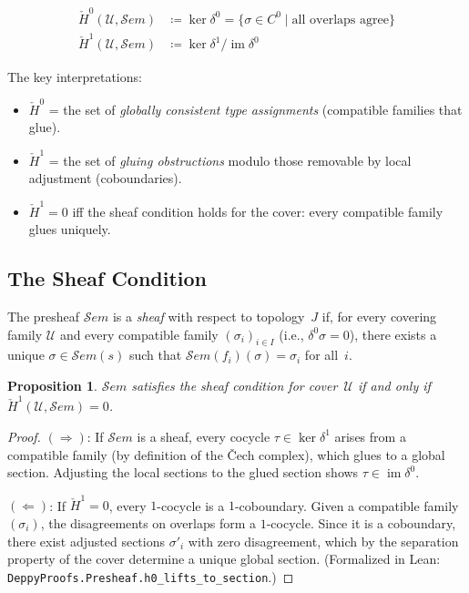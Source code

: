 \documentclass[acmsmall,screen]{acmart}
\newtheorem{proposition}{Proposition}
\theoremstyle{remark}
\newcommand{\Sem}{\mathcal{S}\mathit{em}}
\newcommand{\Hc}[1]{\check{H}^{#1}}
\newcommand{\im}{\operatorname{im}}
\newcommand{\defeq}{\coloneqq}
\begin{document}
\begin{definition}\label{def:cech-groups}
\begin{align*}
  \Hc{0}(\mathcal{U}, \Sem) &\defeq \ker \delta^0
    = \{ \sigma \in C^0 \mid \text{all overlaps agree} \} \\
  \Hc{1}(\mathcal{U}, \Sem) &\defeq \ker \delta^1 / \im \delta^0
\end{align*}
\end{definition}

The key interpretations:
\begin{itemize}[nosep]
  \item $\Hc{0}$ = the set of \emph{globally consistent type
    assignments} (compatible families that glue).
  \item $\Hc{1}$ = the set of \emph{gluing obstructions} modulo
    those removable by local adjustment (coboundaries).
  \item $\Hc{1} = 0$ iff the sheaf condition holds for the cover:
    every compatible family glues uniquely.
\end{itemize}

\subsection{The Sheaf Condition}\label{sec:sheaf-condition}

\begin{definition}\label{def:sheaf}
The presheaf $\Sem$ is a \emph{sheaf} with respect to
topology~$J$ if, for every covering family $\mathcal{U}$ and every
compatible family $(\sigma_i)_{i \in I}$ (i.e., $\delta^0 \sigma = 0$),
there exists a unique $\sigma \in \Sem(s)$ such that
$\Sem(f_i)(\sigma) = \sigma_i$ for all~$i$.
\end{definition}

\begin{proposition}\label{prop:sheaf-iff-h1}
$\Sem$ satisfies the sheaf condition for cover~$\mathcal{U}$ if and
only if $\Hc{1}(\mathcal{U}, \Sem) = 0$.
\end{proposition}

\begin{proof}
$(\Rightarrow)$: If $\Sem$ is a sheaf, every cocycle $\tau \in
\ker\delta^1$ arises from a compatible family (by definition of the
\v{C}ech complex), which glues to a global section.  Adjusting the
local sections to the glued section shows $\tau \in \im\delta^0$.

$(\Leftarrow)$: If $\Hc{1} = 0$, every $1$-cocycle is a
$1$-coboundary.  Given a compatible family $(\sigma_i)$, the
disagreements on overlaps form a $1$-cocycle.  Since it is a
coboundary, there exist adjusted sections $\sigma'_i$ with zero
disagreement, which by the separation property of the cover determine
a unique global section.  (Formalized in Lean: \texttt{DeppyProofs.Presheaf.h0\_lifts\_to\_section}.)
\end{proof}
\end{document}
